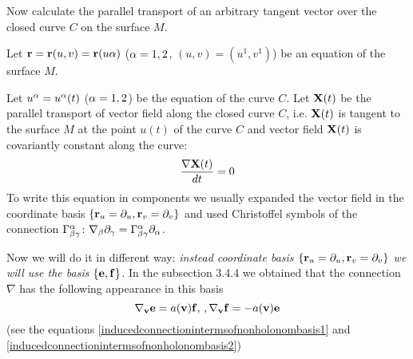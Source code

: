\documentclass[12pt]{article}
\theoremstyle{theorem}
\numberwithin{equation}{section}
\begin{document}
             Now calculate the parallel transport of an arbitrary tangent vector over the closed curve $C$
             on the surface $M$.



 Let ${\bf r}={\bf r}(u,v)={\bf r}(u\alpha)$ ($\alpha=1,2$, $(u,v)=(u^1,v^1)$) be an equation of the surface $M$.

Let $u^\alpha=u^\alpha(t)$ ($\alpha=1,2$) be the equation of the curve $C$.
Let ${\bf X}(t)$ be the parallel transport of vector field along the closed curve $C$,
i.e. ${\bf X}(t)$ is tangent to the surface $M$ at the point $u(t)$ of the curve $C$ and
vector field ${\bf X}(t)$ is covariantly constant along the curve:
      $$
    {\nabla {\bf X}(t)\over dt}=0
      $$
     To write this equation in components we usually  expanded the vector field
in the coordinate basis $\{{\bf r}_u=\partial_u,{\bf r}_v=\partial_v\}$ and used Christoffel symbols of the connection
  $\Gamma^\alpha_{\beta\gamma}\colon \nabla_\beta\partial_\gamma=\Gamma^\alpha_{\beta\gamma}\partial_\alpha$.

  Now we will do it in different way: {\it instead coordinate basis $\{{\bf r}_u=\partial_u,{\bf r}_v=\partial_v\}$ we will use
  the basis $\{{\bf e},{\bf f}\}$.}   In the subsection 3.4.4 we obtained that the connection $\nabla$ has the following appearance
  in this basis
  \begin{equation}\label{indconforrotation}
    \nabla_{\bf v}{\bf e}=a({\bf v}){\bf f},\,, \nabla_{\bf v}{\bf f}=-a({\bf v}){\bf e}
  \end{equation}
  (see the equations \eqref{inducedconnectionintermsofnonholonombasis1} and \eqref{inducedconnectionintermsofnonholonombasis2})
\end{document}

